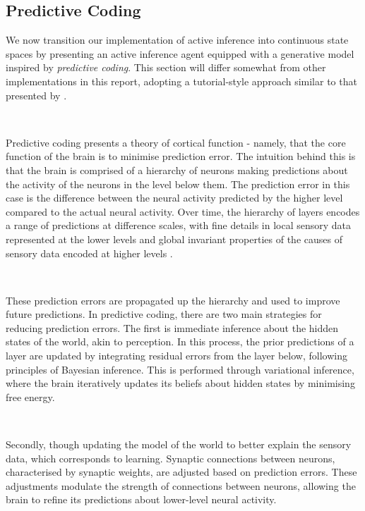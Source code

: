 \documentclass{article}
\begin{document}
\subsection{Predictive Coding}\label{section:predictive_coding}

We now transition our implementation of active inference into continuous state spaces by presenting an active inference agent equipped with a generative model inspired by \textit{predictive coding}. This section will differ somewhat from other implementations in this report, adopting a tutorial-style approach similar to that presented by \citet{bogacz2017tutorial}.

\

Predictive coding presents a theory of cortical function - namely, that the core function of the brain is to minimise prediction error. The intuition behind this is that the brain is comprised of a hierarchy of neurons making predictions about the activity of the neurons in the level below them. \citep{friston2008hierarchical} The prediction error in this case is the difference between the neural activity predicted by the higher level compared to the actual neural activity. Over time, the hierarchy of layers encodes a range of predictions at difference scales, with fine details in local sensory data represented at the lower levels and global invariant properties of the causes of sensory data encoded at higher levels \citep{millidge2021applications}. 

\

These prediction errors are propagated up the hierarchy and used to improve future predictions. In predictive coding, there are two main strategies for reducing prediction errors. The first is immediate inference about the hidden states of the world, akin to perception. In this process, the prior predictions of a layer are updated by integrating residual errors from the layer below, following principles of Bayesian inference. This is performed through variational inference, where the brain iteratively updates its beliefs about hidden states by minimising free energy.

\

Secondly, though updating the model of the world to better explain the sensory data, which corresponds to learning. Synaptic connections between neurons, characterised by synaptic weights, are adjusted based on prediction errors. These adjustments modulate the strength of connections between neurons, allowing the brain to refine its predictions about lower-level neural activity.
\end{document}
